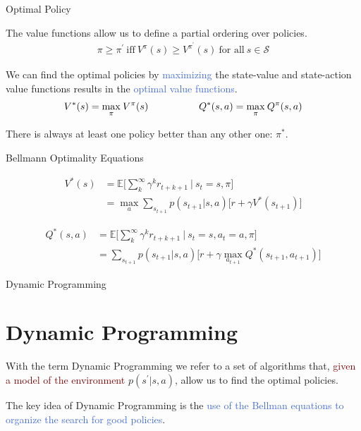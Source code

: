 \documentclass{beamer}
\begin{document}
\begin{frame}{Optimal Policy}

The value functions allow us to define a partial ordering over policies. 
	\begin{align*}
		\pi \geq \pi^{\prime}\: \text{iff}\: V^{\pi}(s) \geq V^{\pi^{'}}(s) \: \text{for all}\: s\in\mathcal{S}
	\end{align*}
	
	We can find the optimal policies by \textcolor{RoyalBlue}{maximizing} the state-value and state-action value functions results in the \textcolor{RoyalBlue}{optimal value functions}.
	\begin{align*}
	V^{*}(s)=\underset{\pi}{\max}\:V^{\pi}(s) \hspace{18mm} Q^{*}(s,a)= \underset{\pi}{\max}\:Q^{\pi}(s,a)
	\end{align*}

There is always at least one policy better than any other one: $\pi^{*}$.

\end{frame}

\begin{frame}{Bellmann Optimality Equations}

   \begin{align*}
	V^{*}(s)& = \mathds{E} \bigg[\sum_{k}^{\infty}\gamma^{k} r_{t+k+1} \: \bigg| \: s_t=s,\pi \bigg] \\
		   & = \max_a \sum_{s_{t+1}} p(s_{t+1}|s,a)\big[r + \gamma V^{*}(s_{t+1}) \big] 
	\end{align*}
	
	   \begin{align*}
	Q^{*}(s,a)& = \mathds{E} \bigg[\sum_{k}^{\infty}\gamma^{k} r_{t+k+1} \: \bigg| \: s_t=s, a_t=a,\pi \bigg] \\
		   & = \sum_{s_{t+1}} p(s_{t+1}|s,a)\big[r + \gamma \max_{a_{t+1}}Q^{*}(s_{t+1}, a_{t+1}) \big] 
	\end{align*}

\end{frame}



\begin{frame}{Dynamic Programming}
\section{Dynamic Programming}

With the term Dynamic Programming we refer to a set of algorithms that, \textcolor{Maroon}{given a model of the environment} $p(s^{\prime}| s, a)$, allow us to find the optimal policies.

\vspace{3mm}

The key idea of Dynamic Programming is the \textcolor{RoyalBlue}{use of the Bellman equations to organize the search for good policies}.

\end{frame}
\end{document}
